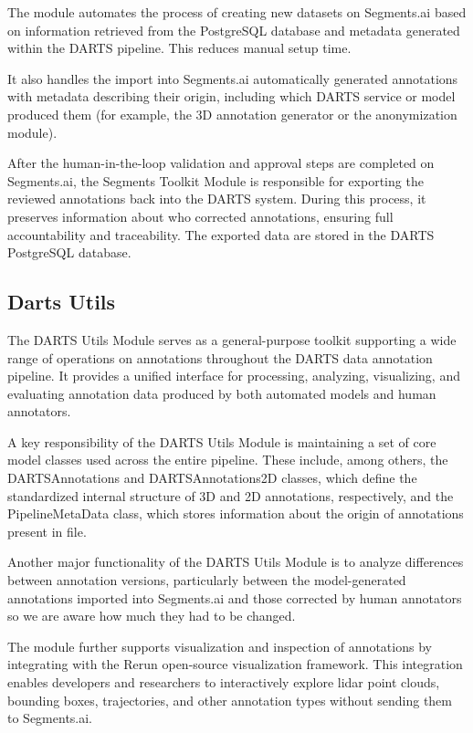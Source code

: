 \documentclass[conference]{IEEEtran}
\begin{document}
The module automates the process of creating new datasets on Segments.ai based on information retrieved from the PostgreSQL database and metadata generated within the DARTS pipeline. This reduces manual setup time.

It also handles the import into Segments.ai automatically generated annotations with metadata describing their origin, including which DARTS service or model produced them (for example, the 3D annotation generator or the anonymization module).

After the human-in-the-loop validation and approval steps are completed on Segments.ai, the Segments Toolkit Module is responsible for exporting the reviewed annotations back into the DARTS system. During this process, it preserves information about who corrected annotations, ensuring full accountability and traceability. The exported data are stored in the DARTS PostgreSQL database.

\subsection{Darts Utils}

The DARTS Utils Module serves as a general-purpose toolkit supporting a wide range of operations on annotations throughout the DARTS data annotation pipeline. It provides a unified interface for processing, analyzing, visualizing, and evaluating annotation data produced by both automated models and human annotators.

A key responsibility of the DARTS Utils Module is maintaining a set of core model classes used across the entire pipeline. These include, among others, the DARTSAnnotations and DARTSAnnotations2D classes, which define the standardized internal structure of 3D and 2D annotations, respectively, and the PipelineMetaData class, which stores information about the origin of annotations present in file.

Another major functionality of the DARTS Utils Module is to analyze differences between annotation versions, particularly between the model-generated annotations imported into Segments.ai and those corrected by human annotators so we are aware how much they had to be changed.

The module further supports visualization and inspection of annotations by integrating with the Rerun open-source visualization framework\cite{rerun}. This integration enables developers and researchers to interactively explore lidar point clouds, bounding boxes, trajectories, and other annotation types without sending them to Segments.ai.
\end{document}
